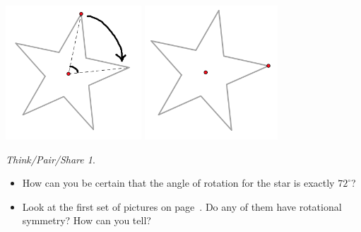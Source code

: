 \documentclass[12pt, reqno]{amsart}
\theoremstyle{remark}
\newtheorem*{thinkpair*}{Think/Pair/Share}
\theoremstyle{definition}
\numberwithin{equation}{section}  %
\begin{document}
\bigskip


\begin{center}
\includegraphics[height=5cm]{starrot1}
\qquad\qquad
\includegraphics[height=5cm]{starrot2}
\end{center}

\bigskip
\bigskip

\begin{thinkpair*}\
\begin{itemize}
\item
How can you be certain that the angle of rotation for the star is exactly $72^\circ$?\\

\item
Look at the first set of pictures on page~\pageref{pics:symm}.  Do any of them have rotational symmetry?  How can you tell?
\end{itemize}  
\end{thinkpair*}




\bigskip
\end{document}
